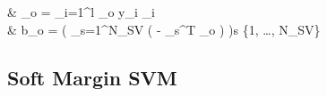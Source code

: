 \documentclass{tron}
\begin{document}
\begin{definition}{}
	\begin{eqn}{}
	\begin{split}
		 & \wv_o = \sum_{i=1}^l \alpha_o y_i \xv_i  \\
		 & b_o =  \left( \sum_{s=1}^{N_{SV}} \left(  - \xv_s^T \wv_o \right) \right)\quad \forall s \in \{1, \dots, N_{SV}\}
	\end{split}
	\end{eqn}
\end{definition}

\clearpage

\subsection{Soft Margin SVM}
\end{document}
